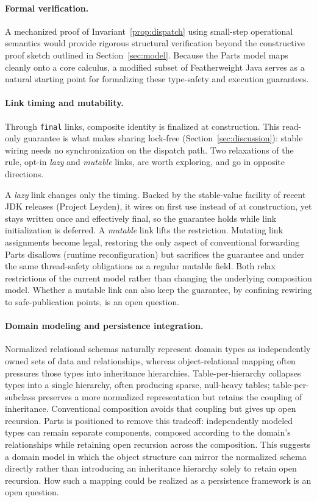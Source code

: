 \documentclass[acmsmall,nonacm]{acmart}
\theoremstyle{acmplain}
\newcommand{\code}[1]{\texttt{#1}}
\begin{document}
\paragraph{Formal verification.}
A mechanized proof of Invariant~\ref{prop:dispatch} using small-step operational semantics would provide rigorous structural
verification beyond the constructive proof sketch outlined in Section~\ref{sec:model}. Because the Parts model maps cleanly
onto a core calculus, a modified subset of Featherweight Java serves as a natural starting point for formalizing these type-safety
and execution guarantees.

\paragraph{Link timing and mutability.}
Through \code{final} links, composite identity is finalized at construction. This read-only guarantee is what makes sharing
lock-free (Section~\ref{sec:discussion}): stable wiring needs no synchronization on the dispatch path. Two relaxations of
the rule, opt-in \emph{lazy} and \emph{mutable} links, are worth exploring, and go in opposite directions.

A \emph{lazy} link changes only the timing. Backed by the stable-value facility of recent
JDK releases (Project Leyden), it wires on first use instead of at construction, yet stays written once and
effectively final, so the guarantee holds while link initialization is deferred. A \emph{mutable} link
lifts the restriction. Mutating link assignments become legal, restoring the only aspect
of conventional forwarding Parts disallows (runtime reconfiguration) but sacrifices the
guarantee and under the same thread-safety obligations as a regular mutable field.
Both relax restrictions of the current model rather than changing the underlying composition model.
Whether a mutable link can also keep the guarantee, by confining rewiring to safe-publication points, is an open question.

\paragraph{Domain modeling and persistence integration.}
Normalized relational schemas naturally represent domain types as independently owned sets of data and relationships, whereas
object-relational mapping often pressures those types into inheritance hierarchies. Table-per-hierarchy collapses types
into a single hierarchy, often producing sparse, null-heavy tables; table-per-subclass preserves a more normalized representation
but retains the coupling of inheritance. Conventional composition avoids that coupling but gives up open recursion. Parts
is positioned to remove this tradeoff: independently modeled types can remain separate components, composed according to the domain's relationships
while retaining open recursion across the composition. This suggests a domain model in which the object structure can mirror
the normalized schema directly rather than introducing an inheritance hierarchy solely to retain open recursion. How such
a mapping could be realized as a persistence framework is an open question.
\end{document}
